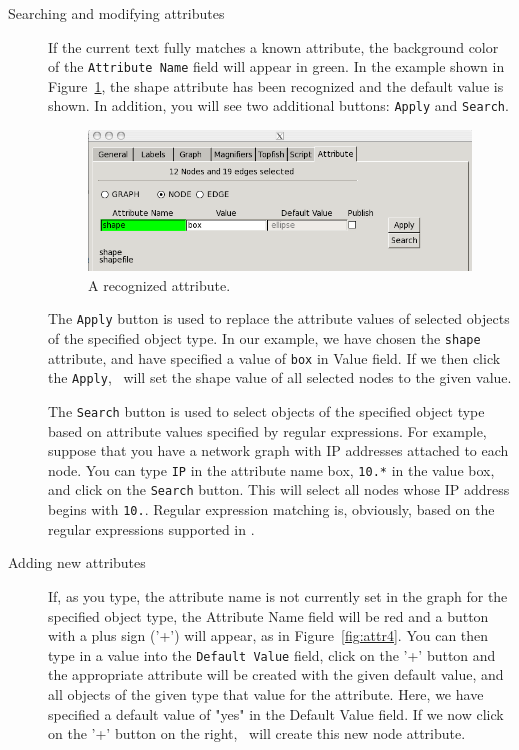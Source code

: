 \begin{description}
\item[Searching and modifying attributes]
If the current text fully matches a known attribute,
the background color of the {\tt Attribute Name} field will appear in green. 
In the example shown in Figure~\ref{fig:attr3}, the shape attribute has been
recognized and the default value is shown. 
In addition, you will see two additional buttons: {\tt Apply} and {\tt Search}.

\begin{figure}[ht]
\begin{center}
\includegraphics[scale=.5]{figures/attr3.png}
\caption{\small A recognized attribute.}
\label{fig:attr3}
\end{center}
\end{figure}

The {\tt Apply} button is used to replace the attribute values of selected objects of the 
specified object type. In our example, we have chosen the {\tt shape} attribute, 
and have specified a value of {\tt box} in Value field. If we then click the {\tt Apply},
\smyrna\ will set the shape value of all selected nodes to the given value.

The {\tt Search} button is used to select objects of the specified object type based on
attribute values specified by regular expressions.
For example, suppose that you have a network graph with IP addresses 
attached to each node. You can type {\tt IP} in the attribute name box, {\tt 10.*} in the
value box, and click on the {\tt Search} button. 
This will select all nodes whose IP address begins with {\tt 10.}. Regular expression
matching is, obviously, based on the regular expressions supported in \gvpr.

\item[Adding new attributes]
If, as you type, the attribute name is not currently set in the graph for the specified object type,
the Attribute Name field will be red and
a button with a plus sign ('+') will appear, as in Figure~\ref{fig:attr4}.
You can then type in a value into the {\tt Default Value} field, click on the '+' button and
the appropriate attribute will be created with the given default value, and all objects
of the given type that value for the attribute.
Here, we have specified a default
value of "yes" in the Default Value field. If we now click on the '+' button on the right,
\smyrna\ will create this new node attribute.

\end{description}

